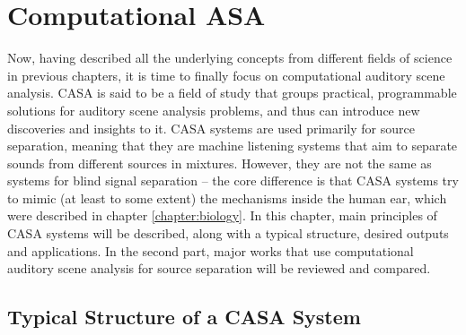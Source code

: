 \chapter{Computational ASA}

Now, having described all the underlying concepts from different fields of science in previous chapters, it is time to finally focus on computational auditory scene analysis. CASA is said to be a field of study that groups practical, programmable solutions for auditory scene analysis problems, and thus can introduce new discoveries and insights to it. CASA systems are used primarily for source separation, meaning that they are machine listening systems that aim to separate sounds from different sources in mixtures. However, they are not the same as systems for blind signal separation – the core difference is that CASA systems try to mimic (at least to some extent) the mechanisms inside the human ear, which were described in chapter \ref{chapter:biology}. In this chapter, main principles of CASA systems will be described, along with a typical structure, desired outputs and applications. In the second part, major works that use computational auditory scene analysis for source separation will be reviewed and compared.

\section{Typical Structure of a CASA System}